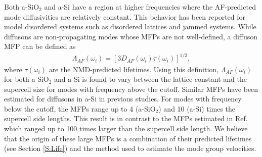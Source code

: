 \documentclass[aps,prb,onecolumn,preprint,superscriptaddress,footinbib,amsmath,amssymb,floatfix]{revtex4}
\begin{document}
Both a-SiO$_2$ and a-Si have a region at higher frequencies where the 
AF-predicted mode diffusivities are relatively constant. This behavior 
has been reported for model disordered systems such as 
disordered lattices\cite{sheng_heat_1991,beltukov_ioffe-regel_2013,
larkin_predicting_2013} and jammed systems.
\cite{xu_energy_2009,vitelli_heat_2010}  
While diffusons are non-propagating modes whose MFPs are not 
well-defined,\cite{feldman_thermal_1993} 
a diffuson MFP can be defined as
\begin{equation}\label{EQ:LambdaAF}
\begin{split}
\Lambda_{AF}(\omega_i) = [3D_{AF}(\omega_i)\tau(\omega_i)]^{1/2},
\end{split}
\end{equation}
where $\tau(\omega_{i})$ are the NMD-predicted lifetimes. Using this 
definition, $\Lambda_{AF}(\omega_i)$ for both a-SiO$_2$ and a-Si 
is found to vary between the lattice constant and 
the supercell size for modes with frequency above the cutoff. 
Similar MFPs have been estimated for diffusons in a-Si in 
previous studies.\cite{feldman_thermal_1993,feldman_numerical_1999} 
For modes with frequency below the cutoff, the MFPs range up to 
4 (a-SiO$_2$) and 10 (a-Si) times the supercell side lengths. 
This result is in contrast to the MFPs estimated in 
Ref. 
which ranged up to 100 times larger than the 
supercell side length. We believe that the origin of these large MFPs 
is a combination of their predicted lifetimes 
(see Section \ref{S:Life}) 
and the method used to estimate the mode group velocities.
\end{document}
